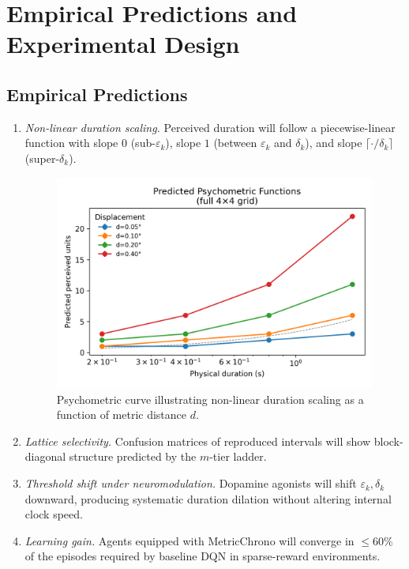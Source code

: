 \documentclass[11pt]{article}
\begin{document}
\section{Empirical Predictions and Experimental Design}

\subsection{Empirical Predictions}

\begin{enumerate}[label=\textbf{P\arabic*}]
    \item \label{pred:nonlinear} \emph{Non-linear duration scaling.}  Perceived
    duration will follow a piecewise-linear function with slope $0$
    (sub-$\varepsilon_k$), slope $1$ (between $\varepsilon_k$ and
    $\delta_k$), and slope $\lceil\cdot/\delta_k\rceil$ (super-$\delta_k$).
    \begin{figure}[ht]
      \centering
      \includegraphics[width=0.9\linewidth]{figures/psychometric_curve.png}
      \caption{Psychometric curve illustrating non-linear duration scaling as a function of metric distance \(d\).}
      \label{fig:psychometric_curve}
    \end{figure}
    \item \label{pred:lattice} \emph{Lattice selectivity.}  Confusion matrices of
    reproduced intervals will show block-diagonal structure predicted by the
    $m$-tier ladder.
    \item \label{pred:pharma} \emph{Threshold shift under neuromodulation.}
    Dopamine agonists will shift $\varepsilon_k,\delta_k$ downward, producing
    systematic duration dilation without altering internal clock speed.
    \item \label{pred:agent} \emph{Learning gain.}  Agents equipped with
    MetricChrono will converge in $\le\!60\%$ of the episodes required by
    baseline DQN in sparse-reward environments.
\end{enumerate}
\end{document}
